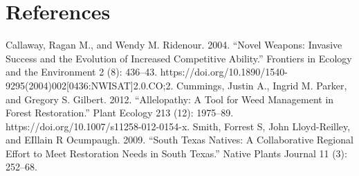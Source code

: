 \documentclass{article}
\begin{document}
\section{References}
Callaway, Ragan M., and Wendy M. Ridenour. 2004. “Novel Weapons: Invasive Success and the Evolution of Increased Competitive Ability.” Frontiers in Ecology and the Environment 2 (8): 436–43. https://doi.org/10.1890/1540-9295(2004)002[0436:NWISAT]2.0.CO;2.\newline 
Cummings, Justin A., Ingrid M. Parker, and Gregory S. Gilbert. 2012. “Allelopathy: A Tool for Weed Management in Forest Restoration.” Plant Ecology 213 (12): 1975–89. https://doi.org/10.1007/s11258-012-0154-x.\newline 
Smith, Forrest S, John Lloyd-Reilley, and EIllain R Ocumpaugh. 2009. “South Texas Natives: A Collaborative Regional Effort to Meet Restoration Needs in South Texas.” Native Plants Journal 11 (3): 252–68.
\end{document}
